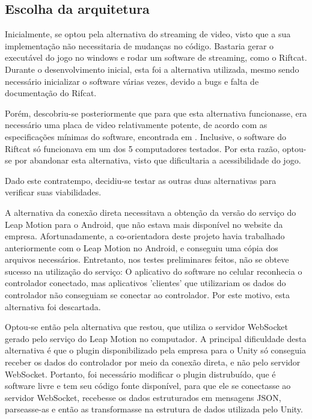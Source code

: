 \subsection{Escolha da arquitetura}\label{subsec-arquitetura-escolha}

Inicialmente, se optou pela alternativa do streaming de video, visto que a sua implementação não necessitaria de mudanças no código. Bastaria gerar o executável do jogo no windows e rodar um software de streaming, como o Riftcat. Durante o desenvolvimento inicial, esta foi a alternativa utilizada, mesmo sendo necessário inicializar o software várias vezes, devido a bugs e falta de documentação do Rifcat.

Porém, descobriu-se posteriormente que para que esta alternativa funcionasse, era necessário uma placa de video relativamente potente, de acordo com as especificações mínimas do software, encontrada em \cite{riftcat:2016:requirements}. Inclusive, o software do Riftcat só funcionava em um dos 5 computadores testados. Por esta razão, optou-se por abandonar esta alternativa, visto que dificultaria a acessibilidade do jogo.

Dado este contratempo, decidiu-se testar as outras duas alternativas para verificar suas viabilidades. 

A alternativa da conexão direta necessitava a obtenção da versão do serviço do Leap Motion para o Android, que não estava mais disponível no website da empresa. Afortunadamente, a co-orientadora deste projeto havia trabalhado anteriormente com o Leap Motion no Android, e conseguiu uma cópia dos arquivos necessários. Entretanto, nos testes preliminares feitos, não se obteve sucesso na utilização do serviço: O aplicativo do software no celular reconhecia o controlador conectado, mas aplicativos 'clientes' que utilizariam os dados do controlador não conseguiam se conectar ao controlador. Por este motivo, esta alternativa foi descartada.

Optou-se então pela alternativa que restou, que utiliza o servidor WebSocket gerado pelo serviço do Leap Motion no computador. A principal dificuldade desta alternativa é que o plugin disponibilizado pela empresa para o Unity só conseguia receber os dados do controlador por meio da conexão direta, e não pelo servidor WebSocket. Portanto, foi necessário modificar o plugin distrubuído, que é software livre e tem seu código fonte disponível, para que ele se conectasse ao servidor WebSocket, recebesse os dados estruturados em mensagens JSON, parseasse-as e então as transformasse na estrutura de dados utilizada pelo Unity.

